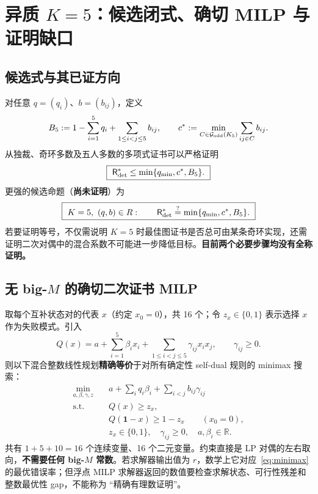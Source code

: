 \documentclass[11pt,a4paper]{ctexart}
\theoremstyle{definition}
\newcommand{\Risk}{\mathsf R}
\newcommand{\bbone}{\mathbf 1}
\newcommand{\GG}{\mathcal G}
\begin{document}
\section{异质 $K=5$：候选闭式、确切 MILP 与证明缺口}
\subsection{候选式与其已证方向}
对任意 $q=(q_i)$、$b=(b_{ij})$，定义
\[
B_5:=1-\sum_{i=1}^5q_i+\sum_{1\le i<j\le5}b_{ij},\qquad
c^*:=\min_{C\in\GG_{\rm odd}(K_5)}\sum_{ij\in C}b_{ij}.
\]
从独裁、奇环多数及五人多数的多项式证书可以严格证明
\begin{equation}\label{eq:heteroupper}
\boxed{\ \Risk_{\rm det}^*\le\min\{q_{\min},c^*,B_5\}.\ }
\end{equation}
更强的候选命题（\textbf{尚未证明}）为
\begin{equation}\label{eq:heteroconj}
\boxed{\ K=5,\ (q,b)\in R:\qquad
\Risk_{\rm det}^*\stackrel{?}{=}\min\{q_{\min},c^*,B_5\}.\ }
\end{equation}
若要证明等号，不仅需说明 $K=5$ 时最佳图证书是否总可由某条奇环实现，还需证明二次对偶中的混合系数不可能进一步降低目标。\textbf{目前两个必要步骤均没有全称证明。}

\subsection{无 big-$M$ 的确切二次证书 MILP}
取每个互补状态对的代表 $x$（约定 $x_0=0$），共 16 个；令 $z_x\in\{0,1\}$ 表示选择 $x$ 作为失败模式。引入
\[
Q(x)=a+\sum_{i=1}^5\beta_ix_i+\sum_{1\le i<j\le5}\gamma_{ij}x_ix_j,\qquad\gamma_{ij}\ge0.
\]
则以下混合整数线性规划\textbf{精确等价}于对所有确定性 self-dual 规则的 minimax 搜索：
\begin{equation}\label{eq:MILP}
\begin{aligned}
\min_{a,\beta,\gamma,z}\quad & a+\sum_iq_i\beta_i+\sum_{i<j}b_{ij}\gamma_{ij}\\
\text{s.t.}\quad & Q(x)\ge z_x,\\
&Q(\bbone-x)\ge1-z_x\qquad(x_0=0),\\
& z_x\in\{0,1\},\quad\gamma_{ij}\ge0,
\quad a,\beta_i\in\mathbb R.
\end{aligned}
\end{equation}
共有 $1+5+10=16$ 个连续变量、16 个二元变量。约束直接是 LP 对偶的左右取向，\textbf{不需要任何 big-$M$ 常数}。若求解器输出值为 $r$，数学上它对应~\eqref{eq:minimax} 的最优错误率；但浮点 MILP 求解器返回的数值要检查求解状态、可行性残差和整数最优性 gap，不能称为 ``精确有理数证明''。
\end{document}

